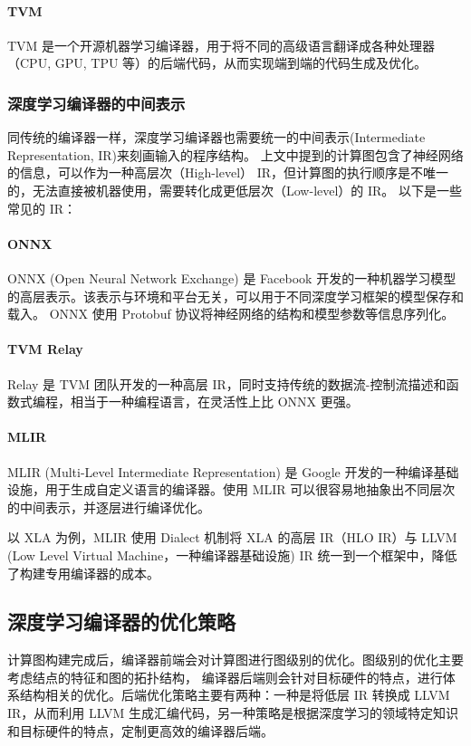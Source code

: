 \paragraph{TVM \cite{DBLP:journals/corr/abs-1802-04799}}
TVM 是一个开源机器学习编译器，用于将不同的高级语言翻译成各种处理器（CPU, GPU, TPU 等）的后端代码，从而实现端到端的代码生成及优化。

\subsubsection{深度学习编译器的中间表示}
同传统的编译器一样，深度学习编译器也需要统一的中间表示(Intermediate Representation, IR)来刻画输入的程序结构。
上文中提到的计算图包含了神经网络的信息，可以作为一种高层次（High-level） IR，但计算图的执行顺序是不唯一的，无法直接被机器使用，需要转化成更低层次（Low-level）的 IR。
以下是一些常见的 IR：
\paragraph{ONNX \cite{onnx}}
ONNX (Open Neural Network Exchange) 是 Facebook 开发的一种机器学习模型的高层表示。该表示与环境和平台无关，可以用于不同深度学习框架的模型保存和载入。
ONNX 使用 Protobuf \cite{enwiki:1061454458} 协议将神经网络的结构和模型参数等信息序列化。
\paragraph{TVM Relay \cite{Relay}}
Relay 是 TVM 团队开发的一种高层 IR，同时支持传统的数据流-控制流描述和函数式编程，相当于一种编程语言，在灵活性上比 ONNX 更强。
\paragraph{MLIR \cite{mlir}}
MLIR (Multi-Level Intermediate Representation) 是 Google 开发的一种编译基础设施，用于生成自定义语言的编译器。使用 MLIR 可以很容易地抽象出不同层次的中间表示，并逐层进行编译优化。

以 XLA 为例，MLIR 使用 Dialect 机制将 XLA 的高层 IR（HLO IR）与 LLVM\cite{enwiki:llvm} (Low Level Virtual Machine，一种编译器基础设施) IR 统一到一个框架中，降低了构建专用编译器的成本。

\subsection{深度学习编译器的优化策略}
计算图构建完成后，编译器前端会对计算图进行图级别的优化。图级别的优化主要考虑结点的特征和图的拓扑结构，
编译器后端则会针对目标硬件的特点，进行体系结构相关的优化。后端优化策略主要有两种：一种是将低层 IR 转换成 LLVM IR，从而利用 LLVM 生成汇编代码，另一种策略是根据深度学习的领域特定知识和目标硬件的特点，定制更高效的编译器后端。

